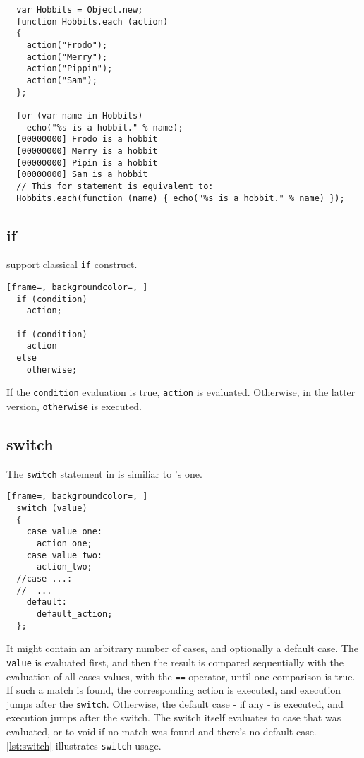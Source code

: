 \documentclass[openright,twoside,12pt]{report}
\begin{document}
\begin{lstlisting}
  var Hobbits = Object.new;
  function Hobbits.each (action)
  {
    action("Frodo");
    action("Merry");
    action("Pippin");
    action("Sam");
  };

  for (var name in Hobbits)
    echo("%s is a hobbit." % name);
  [00000000] Frodo is a hobbit
  [00000000] Merry is a hobbit
  [00000000] Pipin is a hobbit
  [00000000] Sam is a hobbit
  // This for statement is equivalent to:
  Hobbits.each(function (name) { echo("%s is a hobbit." % name) });
\end{lstlisting}

\subsection{if}

\us support classical \lstinline|if| construct.

\begin{lstlisting}[frame=, backgroundcolor=, ]
  if (condition)
    action;

  if (condition)
    action
  else
    otherwise;
\end{lstlisting}

If the \lstinline|condition| evaluation is true, \lstinline|action| is
evaluated. Otherwise, in the latter version, \lstinline|otherwise| is
executed.

\subsection{switch}

The \lstinline|switch| statement in \us is similiar to \C's one.

\begin{lstlisting}[frame=, backgroundcolor=, ]
  switch (value)
  {
    case value_one:
      action_one;
    case value_two:
      action_two;
  //case ...:
  //  ...
    default:
      default_action;
  };
\end{lstlisting}

It might contain an arbitrary number of cases, and optionally a
default case. The \lstinline|value| is evaluated first, and then the
result is compared sequentially with the evaluation of all cases
values, with the \lstinline|==| operator, until one comparison is
true. If such a match is found, the corresponding action is executed,
and execution jumps after the \lstinline|switch|. Otherwise, the
default case - if any - is executed, and execution jumps after the
switch. The switch itself evaluates to case that was evaluated, or to
void if no match was found and there's no default case. \autoref{lst:switch}
illustrates \lstinline|switch| usage.
\end{document}
